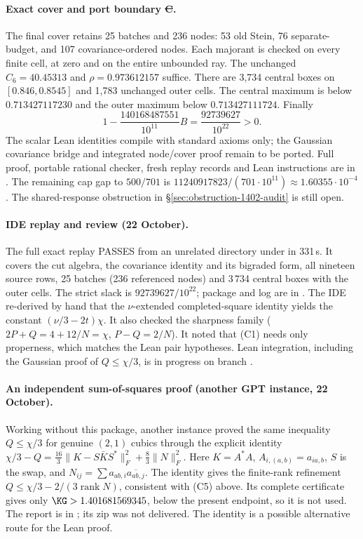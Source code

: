 \paragraph{Exact cover and port boundary \st{C}.}
The final cover retains 25 batches and 236 nodes: 53 old Stein,
76 separate-budget, and 107 covariance-ordered nodes. Each majorant is
checked on every finite cell, at zero and on the entire unbounded ray.
The unchanged $C_6=40.45313$ and $\rho=0.973612157$ suffice.
There are 3,734 central boxes on $[0.846,0.8545]$ and 1,783 unchanged
outer cells. The central maximum is below $0.713427117230$ and the
outer maximum below $0.713427111724$. Finally
\[
 1-\frac{140168487551}{10^{11}}B=\frac{92739627}{10^{22}}>0.
\]
The scalar Lean identities compile with standard axioms only; the
Gaussian covariance bridge and integrated node/cover proof remain to be
ported. Full proof, portable rational checker, fresh replay records and
Lean instructions are in
.
The remaining cap gap to $500/701$ is
$11240917823/(701\cdot10^{11})\approx1.60355\cdot10^{-4}$.
The shared-response obstruction in \S\ref{sec:obstruction-1402-audit}
is still open.

\paragraph{IDE replay and review (22 October).} The full exact replay  PASSES from an unrelated directory under 
in 331\,s. It covers the cut algebra, the covariance identity and its bigraded form, all nineteen source rows, 25 batches (236 referenced nodes) and 3\,734 central boxes
with the outer cells. The strict slack is $92739627/10^{22}$; package and log are in . The IDE re-derived by hand that the
$\nu$-extended completed-square identity yields the constant $(\nu/3-2t)\chi$. It also checked the sharpness family ($2P+Q=4+12/N=\chi$, $P-Q=2/N$). It noted that
(C1) needs only properness, which matches the Lean  pair hypotheses. Lean integration, including the Gaussian proof of $Q\le\chi/3$, is in progress on branch
.

\paragraph{An independent sum-of-squares proof (another GPT instance, 22 October).} Working without this package, another instance proved the same
inequality $Q\le\chi/3$ for genuine $(2,1)$ cubics through the explicit identity
$\chi/3-Q=\frac{16}3\|K-S\bar KS^*\|_F^2+\frac83\|N\|_F^2$. Here $K=A^*A$, $A_{i,(a,b)}=a_{ia,b}$, $S$ is the swap, and $N_{ij}=\sum a_{ab,i}\overline{a_{ab,j}}$.
The identity gives the finite-rank refinement $Q\le\chi/3-2/(3\operatorname{rank}N)$, consistent with (C5) above. Its complete certificate gives only $\KG>1.401681569345$,
below the present endpoint, so it is not used. The report is in ; its zip was not delivered. The identity is a possible alternative route for the Lean proof.
